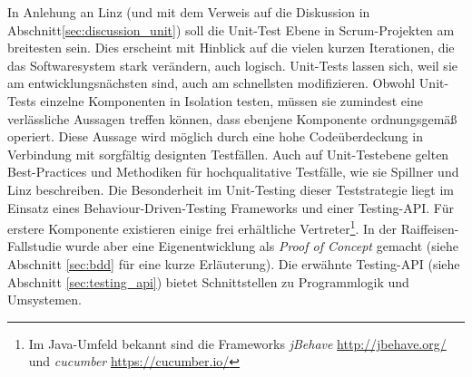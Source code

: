 In Anlehung an Linz\cite{linz_testing_2014} (und mit dem Verweis auf die Diskussion in Abschnitt\ref{sec:discussion_unit}) soll die Unit-Test Ebene in Scrum-Projekten am breitesten sein. Dies erscheint mit Hinblick auf die vielen kurzen Iterationen, die das Softwaresystem stark verändern, auch logisch. Unit-Tests lassen sich, weil sie am entwicklungsnächsten sind, auch am schnellsten modifizieren. Obwohl Unit-Tests einzelne Komponenten in Isolation testen, müssen sie zumindest eine verlässliche Aussagen treffen können, dass ebenjene Komponente ordnungsgemäß operiert. Diese Aussage wird möglich durch eine hohe Codeüberdeckung in Verbindung mit sorgfältig designten Testfällen. Auch auf Unit-Testebene gelten Best-Practices und Methodiken für hochqualitative Testfälle, wie sie Spillner und Linz beschreiben\cite{spillner_software_2014}. Die Besonderheit im Unit-Testing dieser Teststrategie liegt im Einsatz eines Behaviour-Driven-Testing\cite{chelimsky_rspec_2010} Frameworks und einer Testing-API. Für erstere Komponente existieren einige frei erhältliche Vertreter\footnote{Im Java-Umfeld bekannt sind die Frameworks \textit{jBehave} \url{http://jbehave.org/} und \textit{cucumber} \url{https://cucumber.io/}}. In der Raiffeisen-Fallstudie wurde aber eine Eigenentwicklung als \textit{Proof of Concept} gemacht (siehe Abschnitt \ref{sec:bdd} für eine kurze Erläuterung). Die erwähnte Testing-API (siehe Abschnitt \ref{sec:testing_api}) bietet Schnittstellen zu Programmlogik und Umsystemen.\\
